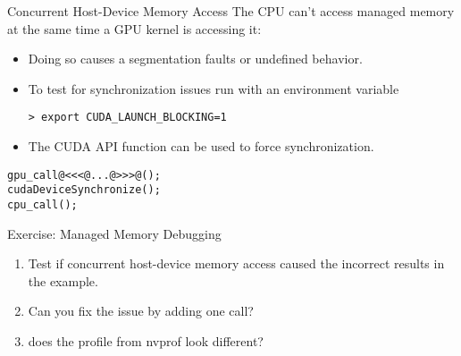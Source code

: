 \documentclass[aspectratio=43]{beamer}
\begin{document}
\begin{frame}[fragile]{Concurrent Host-Device Memory Access}
    The CPU can't access managed memory at the same time a GPU kernel is accessing it:
    \begin{itemize}
        \item Doing so causes a segmentation faults or undefined behavior.
        \item To test for synchronization issues run with an environment variable
        \begin{terminal}{}
            \begin{lstlisting}[style=terminal]
    > export CUDA_LAUNCH_BLOCKING=1
            \end{lstlisting}
        \end{terminal}
    \item The CUDA API function  can be used to force synchronization.
    \end{itemize}
    \begin{code}{}
        \begin{lstlisting}[style=boxcudatiny]
gpu_call@<<<@...@>>>@();
cudaDeviceSynchronize();
cpu_call();
        \end{lstlisting}
    \end{code}{}
\end{frame}

\begin{frame}[fragile]{Exercise: Managed Memory Debugging}
    \begin{enumerate}
        \item Test if concurrent host-device memory access caused the incorrect results in the  example.
        \item Can you fix the issue by adding one  call?
        \item does the profile from nvprof look different?
    \end{enumerate}
\end{frame}
\end{document}
